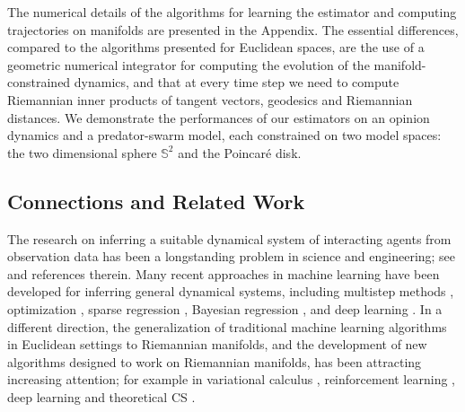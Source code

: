 \documentclass[11pt]{article}
\begin{document}
The numerical details of the algorithms for learning the estimator and computing trajectories on manifolds are presented in the Appendix.  The essential differences,  compared to the algorithms presented for Euclidean spaces, are the use of a geometric numerical integrator for computing the evolution of the manifold-constrained dynamics, and that at every time step we need to compute Riemannian inner products of tangent vectors, geodesics and Riemannian distances.  
We demonstrate the performances of our estimators on an opinion dynamics and a predator-swarm model, each constrained on two model spaces: the two dimensional sphere $\mathbb{S}^2$ and the Poincar\'e disk.
%
\subsection{Connections and Related Work}  
%
The research on inferring a suitable dynamical system of interacting agents from observation data has been a longstanding problem in science and engineering; see \cite{LLEK2010, KTIHC2011, CMW2014, TW2017} and references therein.  Many recent approaches in machine learning have been developed for inferring general dynamical systems, including multistep methods \cite{keller2019discovery}, optimization \cite{wrobel2013evolutionary}, sparse regression \cite{Brunton3932,RBPK2017,Schaeffer6634}, Bayesian regression \cite{zhang2018robust}, and deep learning \cite{raissi2018multistep,rudy2019deep}. 
In a different direction,  the generalization of traditional machine learning algorithms in Euclidean settings to Riemannian manifolds, and the development of new algorithms designed to work on Riemannian manifolds, has been attracting increasing attention; for example in variational calculus \cite{soize2020probabilistic}, reinforcement learning \cite{DBLP:journals/corr/abs-1803-08501}, deep learning \cite{chen2020doubly} and theoretical CS \cite{montealto2020multiagent}. 
%
\end{document}
